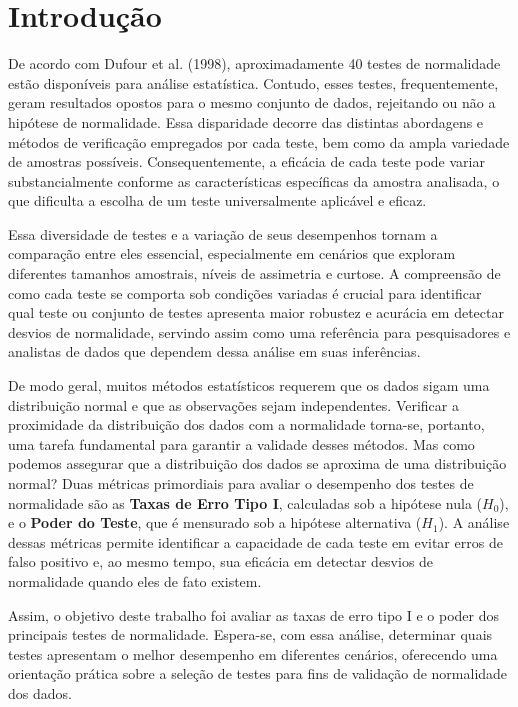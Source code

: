 \documentclass[a4paper,11pt]{article} %
\begin{document}
\section{Introdução} %

De acordo com Dufour et al. (1998), aproximadamente 40 testes de normalidade estão disponíveis para análise estatística. Contudo, esses testes, frequentemente, geram resultados opostos para o mesmo conjunto de dados, rejeitando ou não a hipótese de normalidade. Essa disparidade decorre das distintas abordagens e métodos de verificação empregados por cada teste, bem como da ampla variedade de amostras possíveis. Consequentemente, a eficácia de cada teste pode variar substancialmente conforme as características específicas da amostra analisada, o que dificulta a escolha de um teste universalmente aplicável e eficaz.

\vskip0.3cm

Essa diversidade de testes e a variação de seus desempenhos tornam a comparação entre eles essencial, especialmente em cenários que exploram diferentes tamanhos amostrais, níveis de assimetria e curtose. A compreensão de como cada teste se comporta sob condições variadas é crucial para identificar qual teste ou conjunto de testes apresenta maior robustez e acurácia em detectar desvios de normalidade, servindo assim como uma referência para pesquisadores e analistas de dados que dependem dessa análise em suas inferências.

\vskip0.3cm

De modo geral, muitos métodos estatísticos requerem que os dados sigam uma distribuição normal e que as observações sejam independentes. Verificar a proximidade da distribuição dos dados com a normalidade torna-se, portanto, uma tarefa fundamental para garantir a validade desses métodos. Mas como podemos assegurar que a distribuição dos dados se aproxima de uma distribuição normal? Duas métricas primordiais para avaliar o desempenho dos testes de normalidade são as \textbf{Taxas de Erro Tipo I}, calculadas sob a hipótese nula ($H_0$), e o \textbf{Poder do Teste}, que é mensurado sob a hipótese alternativa ($H_1$). A análise dessas métricas permite identificar a capacidade de cada teste em evitar erros de falso positivo e, ao mesmo tempo, sua eficácia em detectar desvios de normalidade quando eles de fato existem.

\vskip0.3cm

Assim, o objetivo deste trabalho foi avaliar as taxas de erro tipo I e o poder dos principais testes de normalidade. Espera-se, com essa análise, determinar quais testes apresentam o melhor desempenho em diferentes cenários, oferecendo uma orientação prática sobre a seleção de testes para fins de validação de normalidade dos dados.
\end{document}

